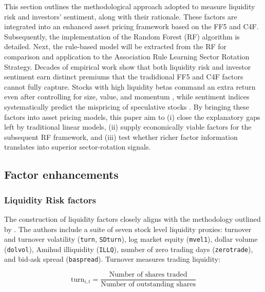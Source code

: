 This section outlines the methodological approach adopted to measure liquidity risk and investors' sentiment, along with their rationale. These factors are integrated into an enhanced asset pricing framework based on the FF5 and C4F. Subsequently, the implementation of the Random Forest (RF) algorithm is detailed. Next, the rule-based model will be extracted from the RF for comparison and application to the Association Rule Learning Sector Rotation Strategy. Decades of empirical work show that both liquidity risk and investor sentiment earn distinct premiums that the tradidional FF5 and C4F factors cannot fully capture. Stocks with high liquidity betas command an extra return even after controlling for size, value, and momentum , while sentiment indices systematically predict the mispricing of speculative stocks . By bringing these factors into asset pricing models, this paper aim to (i) close the explanatory gaps left by traditional linear models, (ii) supply economically viable factors for the subsequent RF framework, and (iii) test whether richer factor information translates into superior sector-rotation signals. 

\subsection{Factor enhancements}
\subsubsection{Liquidity Risk factors}

The construction of liquidity factors closely aligns with the methodology outlined by . The authors include a suite of seven stock level liquidity proxies: turnover and turnover volatility (\texttt{turn}, \texttt{SDturn}), log market equity (\texttt{mvel1}), dollar volume (\texttt{dolvol}), Amihud illiquidity (\texttt{ILLQ}), number of zero trading days (\texttt{zerotrade}), and bid-ask spread (\texttt{baspread}). Turnover measures trading liquidity:

\begin{equation}
\text{turn}_{i,t} = \frac{\text{Number of shares traded}}{\text{Number of outstanding shares}}
\end{equation}

